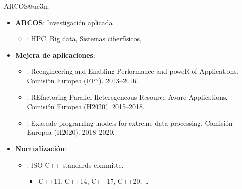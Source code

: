 \begin{frame}{ARCOS@uc3m}
\begin{itemize}
  \item \textbf{ARCOS}: Investigación aplicada.
    \begin{itemize}
      \item {\color{blue}{Líneas}}: 
        HPC,
        Big data,
        Sistemas ciberfísicos,
        .
    \end{itemize} 
  \vfill
  \item \textbf{Mejora de aplicaciones}:
    \begin{itemize}
      \item {}: Reengineering and Enabling Performance and poweR of Applications.
            Comisión Europea (FP7). 2013--2016.
      \item {}: REfactoring Parallel Heterogeneous Resource Aware Applications.
            Comisión Europea (H2020). 2015--2018.
      \item {}: Exascale programIng models for extreme data processing.
            Comisión Europea (H2020). 2018--2020.
    \end{itemize} 
  \vfill
  \item \textbf{Normalización}:
    \begin{itemize}
      \item {}. ISO C++ standards committe.
        \begin{itemize}
          \item C++11, C++14, C++17, C++20, \ldots
        \end{itemize}
    \end{itemize}
\end{itemize}
\end{frame}
